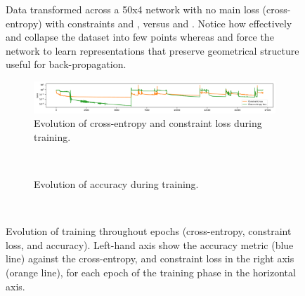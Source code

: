 \begin{figure}
  \caption{Data transformed across a 50x4 network with no main loss (cross-entropy) with constraints \SepLayer and \SepUnitPoint, versus \ReLU and \ReLUBN. Notice how effectively \ReLU and \ReLUBN collapse the dataset into few points whereas \SepLayer and \SepUnitPoint force the network to learn representations that preserve geometrical structure useful for back-propagation.} 
  \label{fig:init} 
\end{figure}



\begin{figure}[h]
    \begin{subfigure}[c]{1\textwidth}
        \centering
        \includegraphics[width=1\textwidth]{img/convergence/peaks_loss.pdf}
        \caption{Evolution of cross-entropy and constraint loss during training.}
        \label{fig:loss_convergence}
    \end{subfigure}
    \\
    \begin{subfigure}[c]{1\textwidth}
        \centering
        \caption{Evolution of accuracy during training.}
        \label{fig:accuracy_convergence}
    \end{subfigure}
    \\
     

    

      \caption{Evolution of training throughout epochs (cross-entropy, constraint loss, and accuracy). Left-hand axis show the accuracy metric (blue line) against the cross-entropy, and constraint loss in the right axis (orange line), for each epoch of the training phase in the horizontal axis.}
	\label{fig:peaks}
	

\end{figure}


